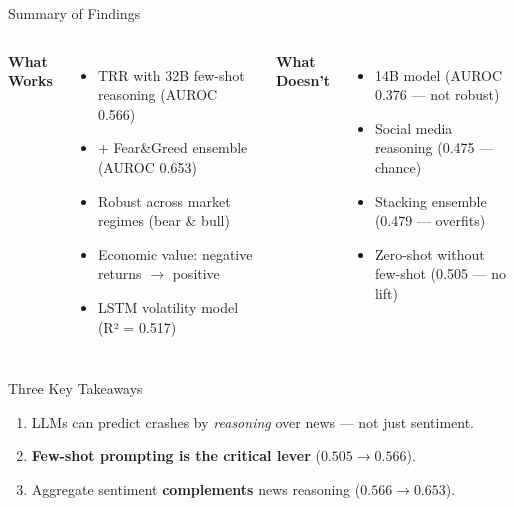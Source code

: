 \documentclass[10pt,aspectratio=169]{beamer}
\begin{document}
\begin{frame}{Summary of Findings}
  \begin{columns}[t]
    \textbf{What Works}
    \begin{itemize}
      \item TRR with 32B few-shot reasoning (AUROC 0.566)
      \item + Fear\&Greed ensemble (AUROC 0.653)
      \item Robust across market regimes (bear \& bull)
      \item \alert{Economic value:} negative returns $\to$ positive
      \item LSTM volatility model (R² = 0.517)
    \end{itemize}
    
    \textbf{What Doesn't}
    \begin{itemize}
      \item 14B model (AUROC 0.376 — not robust)
      \item Social media reasoning (0.475 — chance)
      \item Stacking ensemble (0.479 — overfits)
      \item Zero-shot without few-shot (0.505 — no lift)
    \end{itemize}
  \end{columns}
  
  \vspace{0.3cm}
  \begin{block}{Three Key Takeaways}
    \begin{enumerate}
      \item LLMs can predict crashes by \textit{reasoning} over news — not just sentiment.
      \item \textbf{Few-shot prompting is the critical lever} ($0.505 \to 0.566$).
      \item Aggregate sentiment \textbf{complements} news reasoning ($0.566 \to 0.653$).
    \end{enumerate}
  \end{block}
\end{frame}
\end{document}
